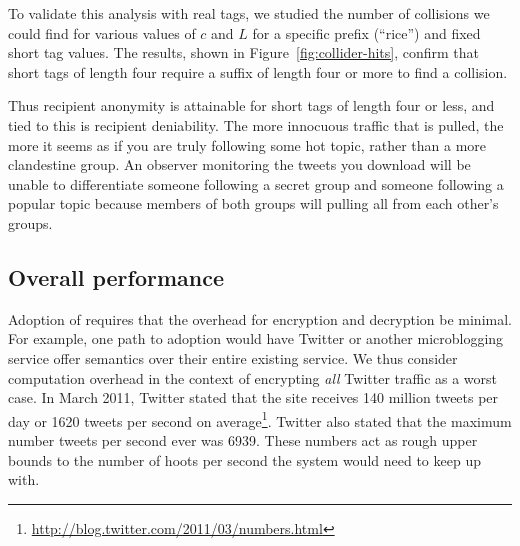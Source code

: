 To validate this analysis with real tags, we studied the number of
collisions we could find for various values of $c$ and $L$ for a
specific prefix (``rice'') and fixed short tag values. The results,
shown in Figure~\ref{fig:collider-hits}, confirm that short tags of
length four require a suffix of length four or more to find a collision.

Thus recipient anonymity is attainable for short tags of length four or
less, and tied to this is recipient deniability. The more innocuous
traffic that is pulled, the more it seems as if you are truly following
some hot topic, rather than a more clandestine group. An observer
monitoring the tweets you download will be unable to differentiate
someone following a secret group and someone following a popular topic
because members of both groups will pulling all \msgs from each other's
groups.
\fi


%

\subsection{Overall \hoot performance}

Adoption of \hoot requires that the overhead for encryption and
decryption be minimal. For example, one path to adoption would have Twitter or
another microblogging service offer \hoot semantics over their entire
existing service. We thus consider computation overhead
in the context of encrypting {\em all} Twitter traffic as a worst case. In
March 2011, Twitter stated that the site receives 140 million tweets per
day or 1620 tweets per second on
average\footnote{\url{http://blog.twitter.com/2011/03/numbers.html}}. Twitter
also stated that the maximum number tweets per second ever was 6939. These numbers act as
rough upper bounds to the number of hoots per second the system would
need to keep up with.

